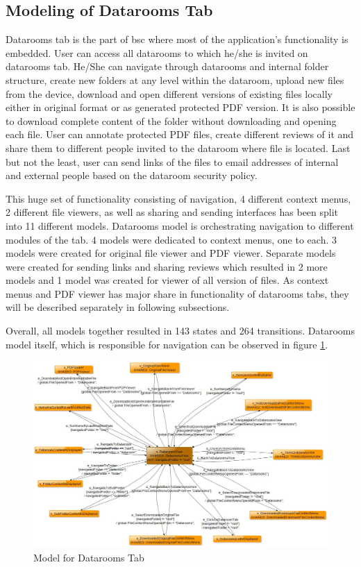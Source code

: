 \subsection{Modeling of Datarooms Tab}
\par
Datarooms tab is the part of \acrshort{bsc} where most of the application's functionality is embedded. User can access all datarooms to which he/she is invited on datarooms tab. He/She can navigate through datarooms and internal folder structure, create new folders at any level within the dataroom, upload new files from the device, download and open different versions of existing files locally either in original format or as generated protected PDF version. It is also possible to download complete content of the folder without downloading and opening each file. User can annotate protected PDF files, create different reviews of it and share them to different people invited to the dataroom where file is located. Last but not the least, user can send links of the files to email addresses of internal and external people based on the dataroom security policy.

\par
This huge set of functionality consisting of navigation, 4 different context menus, 2 different file viewers, as well as sharing and sending interfaces has been split into 11 different models. Datarooms model is orchestrating navigation to different modules of the tab. 4 models were dedicated to context menus, one to each. 3 models were created for original file viewer and PDF viewer. Separate models were created for sending links and sharing reviews which resulted in 2 more models and 1 model was created for viewer of all version of files. As context menus and PDF viewer has major share in functionality of datarooms tabs, they will be described separately in following subsections.

\par
Overall, all models together resulted in 143 states and 264 transitions. Datarooms model itself, which is responsible for navigation can be observed in figure \ref{Fig:Datarooms_Model_Screenshot}.

\begin{figure} [htbp!]
	\centering
					\includegraphics[width=1\textwidth]{figures/Datarooms_model_screenshot}
					\caption{\label{Fig:Datarooms_Model_Screenshot} Model for Datarooms Tab}
\end{figure}

